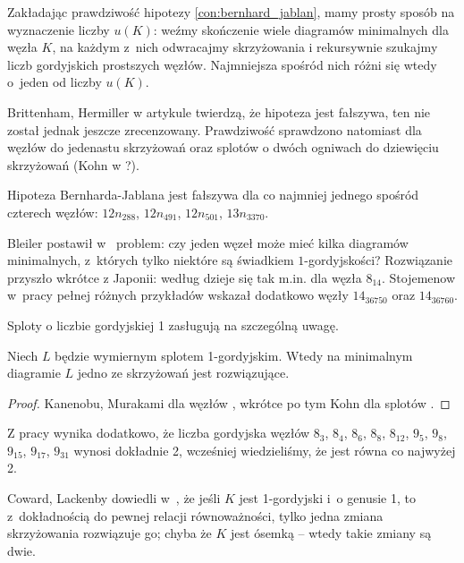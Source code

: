 Zakładając prawdziwość hipotezy \ref{con:bernhard_jablan}, mamy prosty sposób na wyznaczenie liczby $u(K)$: weźmy skończenie wiele diagramów minimalnych dla węzła $K$, na każdym z~nich odwracajmy skrzyżowania i rekursywnie szukajmy liczb gordyjskich prostszych węzłów.
Najmniejsza spośród nich różni się wtedy o~jeden od liczby $u(K)$.

Brittenham, Hermiller w artykule \cite{brittenham17} twierdzą, że hipoteza jest fałszywa, ten nie został jednak jeszcze zrecenzowany.
Prawdziwość sprawdzono natomiast dla węzłów do jedenastu skrzyżowań oraz splotów o dwóch ogniwach do dziewięciu skrzyżowań (Kohn w \cite{kohn93}?).

\begin{example}
    Hipoteza Bernharda-Jablana jest fałszywa dla co najmniej jednego spośród czterech węzłów: $12n_{288}$, $12n_{491}$, $12n_{501}$, $13n_{3370}$.
\end{example}

Bleiler postawił w~\cite{bleiler84} problem: czy jeden węzeł może mieć kilka diagramów minimalnych, z~których tylko niektóre są świadkiem $1$-gordyjskości?
Rozwiązanie przyszło wkrótce z Japonii: według \cite{kanenobumurakami86} dzieje się tak m.in. dla węzła $8_{14}$.
Stojemenow w~pracy \cite{stoimenow01} pełnej różnych przykładów wskazał dodatkowo węzły $14_{36750}$ oraz $14_{36760}$.

Sploty o liczbie gordyjskiej 1 zasługują na szczególną uwagę.

\begin{proposition}
    Niech $L$ będzie wymiernym splotem 1-gordyjskim.
    Wtedy na minimalnym diagramie $L$ jedno ze skrzyżowań jest rozwiązujące.
\end{proposition}

\begin{proof}
    Kanenobu, Murakami dla węzłów \cite{kanenobumurakami86}, wkrótce po tym Kohn dla splotów \cite{kohn91}.
\end{proof}

Z pracy \cite{kanenobumurakami86} wynika dodatkowo, że liczba gordyjska węzłów $8_{3}$, $8_{4}$, $8_{6}$, $8_{8}$, $8_{12}$, $9_{5}$, $9_{8}$, $9_{15}$, $9_{17}$, $9_{31}$ wynosi dokładnie 2, wcześniej wiedzieliśmy, że jest równa co najwyżej 2.

Coward, Lackenby dowiedli w~\cite{coward11}, że jeśli $K$ jest 1-gordyjski i~o genusie 1, to z~dokładnością do pewnej relacji równoważności, tylko jedna zmiana skrzyżowania rozwiązuje go; chyba że $K$ jest ósemką -- wtedy takie zmiany są dwie.

